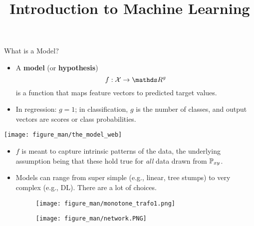 \documentclass[11pt,compress,t,notes=noshow, xcolor=table]{beamer}
\title{Introduction to Machine Learning}
\begin{document}



\begin{vbframe}{What is a Model?}

\begin{itemize}

  \item A \textbf{model} (or \textbf{hypothesis}) 
  $$f : \Xspace \rightarrow \R^g$$ 
  is a function that maps feature vectors to predicted target values.

\item In regression: $g = 1$; in  
classification, $g$ is the number of classes, and output vectors are scores 
or class probabilities. %
  
  
\end{itemize}

\begin{center}
  \texttt{[image: figure\_man/the\_model\_web]} 
\end{center}
  

\framebreak

\begin{itemize}

  \item $f$ is meant to capture intrinsic patterns of the data, the
  underlying assumption being that these hold true for \emph{all} data drawn 
  from $\mathbb{P}_{xy}$.
  
  \item Models can range from super simple (e.g., 
   linear, tree stumps) to very complex (e.g., DL). There are a lot of choices. 
  
  \begin{figure}
  \begin{minipage}{0.4\textwidth}
    \centering
    \texttt{[image: figure\_man/monotone\_trafo1.png]}
  \end{minipage}%
  \begin{minipage}{0.6\textwidth}
    \centering
    \texttt{[image: figure\_man/network.PNG]}
  \end{minipage}
  \end{figure}
  

\end{itemize}
\end{vbframe}
\end{document}
